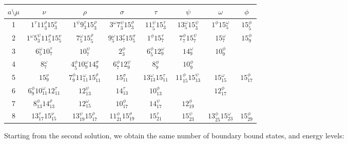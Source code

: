 \documentclass[a4paper,12pt]{report}
\begin{document}
\begin{center}
\begin{tabular}{|c|c|c|c|c|c|c|c|}\hline
 $ a\setminus\mu$ & $\nu$ & $\rho$ & $\sigma$ & $\tau$ & $\psi$ & $\omega$ & $\phi$\\ \hline
1 & $1^{\tau}11_{3}^{\rho}15_{3}^{\nu}$ & $1^{\psi}9_{3}^{\tau}15_{3}^{\rho}$& $3^{\omega}7_{3}^{\psi}15_{3}^{\sigma}$ & $11_{5}^{\psi}15_{3}^{\tau}$ & $13_{5}^{\omega}15_{3}^{\psi}$ & $1^{\phi}15_{5}^{\omega}$ & $15_{5}^{\phi}$\\
\hline

2 & $1^{\omega}5_{3}^{\psi}11_{5}^{\sigma}15_{5}^{\nu}$ & $7_{5}^{\omega}15_{5}^{\rho}$& $9_{5}^{\omega}13_{7}^{\tau}15_{5}^{\sigma}$ & $1^{\phi}15_{7}^{\tau}$ & $7_{7}^{\phi}15_{7}^{\psi}$ & $15_{7}^{\omega}$ & $15_{9}^{\phi}$\\
\hline

3 &  $6_{5}^{\omega}10_{7}^{\tau}$ & $10_{7}^{\psi}$ & $2_{3}^{\phi}$ & $6_{5}^{\phi}12_{9}^{\omega}$ &  $14_{9}^{\omega}$ & $10_{9}^{\phi}$ &\\
\hline

4 &  $8_{7}^{\omega}$ & $4_{5}^{\phi}10_{9}^{\omega}14_{9}^{\sigma}$& $6_{7}^{\phi}12_{9}^{\psi}$& $8_{9}^{\phi}$ & $10_{9}^{\phi}$ & & \\
\hline

5 &  $15_{9}^{\nu}$ & $7_{9}^{\phi}11_{11}^{\omega}15_{11}^{\rho}$& $15_{11}^{\sigma}$& $13_{13}^{\omega}15_{11}^{\tau}$ & $11_{15}^{\phi}15_{13}^{\psi}$ & $15_{15}^{\omega}$ & $15_{17}^{\phi}$ \\
\hline

6 & $6_{9}^{\phi}10_{11}^{\omega}12_{11}^{\tau}$ & $12_{13}^{\psi}$ & $14_{13}^{\tau}$ & $10_{13}^{\phi}$ &&
$12_{17}^{\phi}$ &
\\ \hline

7 & $8_{13}^{\phi}14_{13}^{\rho}$  & $12_{15}^{\omega}$& $10_{17}^{\phi}$ & $14_{17}^{\psi}$ &  $12_{19}^{\phi}$ & &   \\
\hline

8 & $13_{17}^{\tau}15_{15}^{\nu}$ & $13_{19}^{\psi}15_{17}^{\rho}$ & $11_{21}^{\phi}15_{19}^{\sigma}$ & $15_{21}^{\tau}$ &  $15_{23}^{\psi}$ & $13_{25}^{\phi}15_{23}^{\omega}$& $15_{29}^{\phi}$ \\
\hline
  \end{tabular}

\end{center}

\vspace{1.5cm}

Starting from the second solution, we obtain the same number of boundary bound states, and energy levels:
\end{document}
